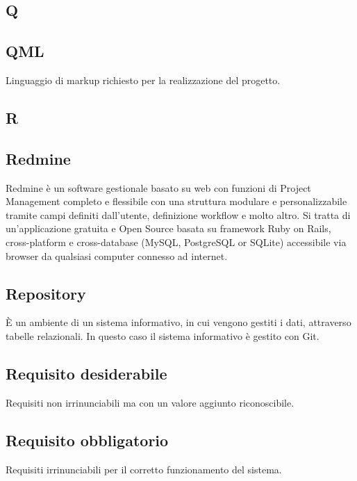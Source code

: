\newpage

\begin{center}
\Huge\section*{\uppercase{Q}}
\end{center}

\subsection*{QML}
Linguaggio di markup richiesto per la realizzazione del progetto.

\newpage

\begin{center}
\Huge\section*{\uppercase{R}}
\end{center}

\subsection*{Redmine}
Redmine è un software gestionale basato su web con funzioni di Project Management completo e flessibile con una struttura modulare e personalizzabile tramite campi definiti dall'utente, definizione workflow e molto altro.
Si tratta di un'applicazione gratuita e Open Source basata su framework Ruby on Rails, cross-platform e cross-database (MySQL, PostgreSQL or SQLite) accessibile via browser da qualsiasi computer connesso ad internet.

\subsection*{Repository}
È un ambiente di un sistema informativo, in cui vengono gestiti i dati, attraverso
tabelle relazionali. In questo caso il sistema informativo è gestito con Git.

\subsection*{Requisito desiderabile}
Requisiti non irrinunciabili ma con un valore aggiunto riconoscibile.

\subsection*{Requisito obbligatorio}
Requisiti irrinunciabili per il corretto funzionamento del sistema.

